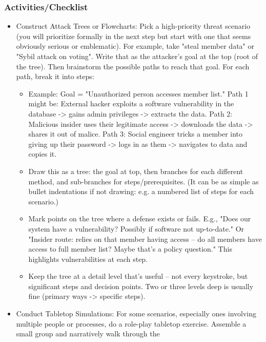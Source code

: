 \subsubsection{Activities/Checklist}

\begin{itemize}   
    \item Construct Attack Trees or Flowcharts: Pick a high-priority threat scenario (you will
    prioritize formally in the next step but start with one that seems obviously serious or emblematic).
    For example, take "steal member data" or "Sybil attack on voting". Write that as the attacker's goal
    at the top (root of the tree). Then brainstorm the possible paths to reach that goal. For each path,
    break it into steps:
        \begin{itemize}   
            \item Example: Goal = "Unauthorized person accesses member list." Path 1 might be: External
            hacker exploits a software vulnerability in the database -> gains admin privileges -> extracts the
            data. Path 2: Malicious insider uses their legitimate access -> downloads the data -> shares it out
            of malice. Path 3: Social engineer tricks a member into giving up their password -> logs in as them
            -> navigates to data and copies it.
            \item Draw this as a tree: the goal at top, then branches for each different method, and
            sub-branches for steps/prerequisites. (It can be as simple as bullet indentations if not drawing:
            e.g. a numbered list of steps for each scenario.)
            \item Mark points on the tree where a defense exists or fails. E.g., "Does our system have a
            vulnerability? Possibly if software not up-to-date." Or "Insider route: relies on that member having
            access – do all members have access to full member list? Maybe that's a policy question." This
            highlights vulnerabilities at each step.
            \item Keep the tree at a detail level that's useful – not every keystroke, but significant
            steps and decision points. Two or three levels deep is usually fine (primary ways -> specific
            steps).
        \end{itemize} 
    \item Conduct Tabletop Simulations: For some scenarios, especially ones involving multiple people or
    processes, do a role-play tabletop exercise. Assemble a small group and narratively walk through the

\end{itemize}
